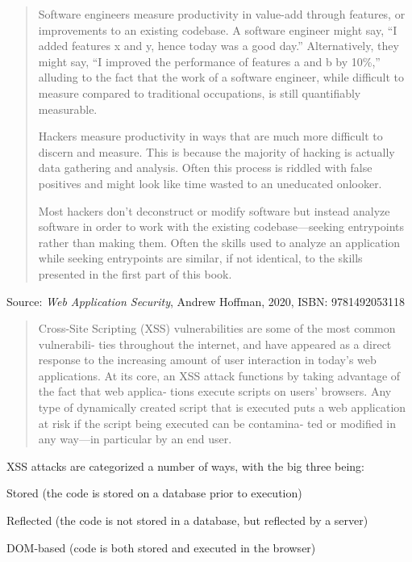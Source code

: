 \documentclass[Screen16to9,17pt]{foils}
\begin{document}
\begin{quote}
Software engineers measure productivity in value-add through features, or improvements to an existing codebase. A software engineer might say, “I added features x and y, hence today was a good day.” Alternatively, they might say, “I improved the performance of features a and b by 10\%,” alluding to the fact that the work of a software engineer, while difficult to measure compared to traditional occupations, is still quantifiably measurable.

Hackers measure productivity in ways that are much more difficult to discern and measure. This is because the majority of hacking is actually data gathering and analysis. Often this process is riddled with false positives and might look like time wasted to an uneducated onlooker.

Most hackers don’t deconstruct or modify software but instead analyze software in order to work with the existing codebase—seeking entrypoints rather than making them. Often the skills used to analyze an application while seeking entrypoints are similar, if not identical, to the skills presented in the first part of this book.
\end{quote}
Source: \emph{Web Application Security}, Andrew Hoffman, 2020, ISBN: 9781492053118




\begin{quote}
  Cross-Site Scripting (XSS) vulnerabilities are some of the most common vulnerabili‐
  ties throughout the internet, and have appeared as a direct response to the increasing
  amount of user interaction in today’s web applications.
  At its core, an XSS attack functions by taking advantage of the fact that web applica‐
  tions execute scripts on users’ browsers. Any type of dynamically created script that is
  executed puts a web application at risk if the script being executed can be contamina‐
  ted or modified in any way—in particular by an end user.
\end{quote}

XSS attacks are categorized a number of ways, with the big three being:
\begin{list2}
  \item Stored (the code is stored on a database prior to execution)
\item Reflected (the code is not stored in a database, but reflected by a server)
\item DOM-based (code is both stored and executed in the browser)
\end{list2}
\end{document}
